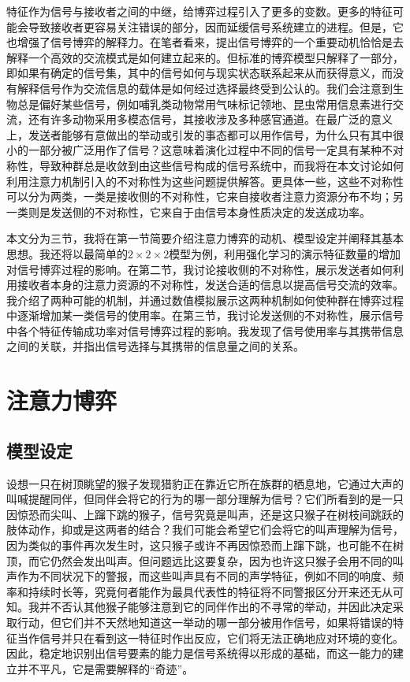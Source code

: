 \documentclass[12pt]{ctexart}  %
\begin{document}
特征作为信号与接收者之间的中继，给博弈过程引入了更多的变数。更多的特征可能会导致接收者更容易关注错误的部分，因而延缓信号系统建立的进程。但是，它也增强了信号博弈的解释力。在笔者看来，提出信号博弈的一个重要动机恰恰是去解释一个高效的交流模式是如何建立起来的。但标准的博弈模型只解释了一部分，即如果有确定的信号集，其中的信号如何与现实状态联系起来从而获得意义，而没有解释信号作为交流信息的载体是如何经过选择最终受到公认的。我们会注意到生物总是偏好某些信号，例如哺乳类动物常用气味标记领地、昆虫常用信息素进行交流，还有许多动物采用多模态信号，其接收涉及多种感官通道。在最广泛的意义上，发送者能够有意做出的举动或引发的事态都可以用作信号，为什么只有其中很小的一部分被广泛用作了信号？这意味着演化过程中不同的信号一定具有某种不对称性，导致种群总是收敛到由这些信号构成的信号系统中，而我将在本文讨论如何利用注意力机制引入的不对称性为这些问题提供解答。更具体一些，这些不对称性可以分为两类，一类是接收侧的不对称性，它来自接收者注意力资源分布不均；另一类则是发送侧的不对称性，它来自于由信号本身性质决定的发送成功率。

本文分为三节，我将在第一节简要介绍注意力博弈的动机、模型设定并阐释其基本思想。我还将以最简单的$2\times 2\times 2$模型为例，利用强化学习的演示特征数量的增加对信号博弈过程的影响。在第二节，我讨论接收侧的不对称性，展示发送者如何利用接收者本身的注意力资源的不对称性，发送合适的信息以提高信号交流的效率。我介绍了两种可能的机制，并通过数值模拟展示这两种机制如何使种群在博弈过程中逐渐增加某一类信号的使用率。在第三节，我讨论发送侧的不对称性，展示信号中各个特征传输成功率对信号博弈过程的影响。我发现了信号使用率与其携带信息之间的关联，并指出信号选择与其携带的信息量之间的关系。


\section{注意力博弈}

\subsection{模型设定}
设想一只在树顶眺望的猴子发现猎豹正在靠近它所在族群的栖息地，它通过大声的叫喊提醒同伴，但同伴会将它的行为的哪一部分理解为信号？它们所看到的是一只因惊恐而尖叫、上蹿下跳的猴子，信号究竟是叫声，还是这只猴子在树枝间跳跃的肢体动作，抑或是这两者的结合？我们可能会希望它们会将它的叫声理解为信号，因为类似的事件再次发生时，这只猴子或许不再因惊恐而上蹿下跳，也可能不在树顶，而它仍然会发出叫声。但问题远比这要复杂，因为也许这只猴子会用不同的叫声作为不同状况下的警报，而这些叫声具有不同的声学特征，例如不同的响度、频率和持续时长等，究竟何者能作为最具代表性的特征将不同警报区分开来还无从可知。我并不否认其他猴子能够注意到它的同伴作出的不寻常的举动，并因此决定采取行动，但它们并不天然地知道这一举动的哪一部分被用作信号，如果将错误的特征当作信号并只在看到这一特征时作出反应，它们将无法正确地应对环境的变化。因此，稳定地识别出信号要素的能力是信号系统得以形成的基础，而这一能力的建立并不平凡，它是需要解释的“奇迹”。
\end{document}
